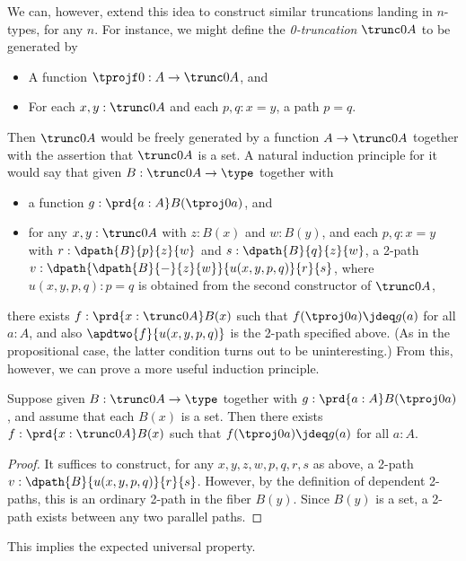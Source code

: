 %
We can, however, extend this idea to construct similar truncations landing in $n$-types, for any $n$.
For instance, we might define the \emph{0-trun\-ca\-tion} $\trunc0A$ to be generated by
\begin{itemize}
\item A function $\tprojf0 : A \to \trunc0 A$, and
\item For each $x,y:\trunc0A$ and each $p,q:x=y$, a path $p=q$.
\end{itemize}
Then $\trunc0A$ would be freely generated by a function $A\to \trunc0A$ together with the assertion that $\trunc0A$ is a set.
A natural induction principle for it would say that given $B:\trunc0 A \to \type$ together with
\begin{itemize}
\item a function $g:\prd{a:A} B(\tproj0a)$, and
\item for any $x,y:\trunc0A$ with $z:B(x)$ and $w:B(y)$, and each $p,q:x=y$ with $r:\dpath{B}{p}{z}{w}$ and $s:\dpath{B}{q}{z}{w}$, a 2-path $v:\dpath{\dpath{B}{-}{z}{w}}{u(x,y,p,q)}{r}{s}$, where $u(x,y,p,q):p=q$ is obtained from the second constructor of $\trunc0A$,
\end{itemize}
there exists $f:\prd{x:\trunc0A} B(x)$ such that $f(\tproj0a)\jdeq g(a)$ for all $a:A$, and also $\apdtwo{f}{u(x,y,p,q)}$ is the 2-path specified above.
(As in the propositional case, the latter condition turns out to be uninteresting.)
From this, however, we can prove a more useful induction principle.

\begin{lem}\label{thm:trunc0-ind}
  Suppose given $B:\trunc0 A \to \type$ together with $g:\prd{a:A} B(\tproj0a)$, and assume that each $B(x)$ is a set.
  Then there exists $f:\prd{x:\trunc0A} B(x)$ such that $f(\tproj0a)\jdeq g(a)$ for all $a:A$.
\end{lem}
\begin{proof}
  It suffices to construct, for any $x,y,z,w,p,q,r,s$ as above, a 2-path $v:\dpath{B}{u(x,y,p,q)}{r}{s}$.
  However, by the definition of dependent 2-paths, this is an ordinary 2-path in the fiber $B(y)$.
  Since $B(y)$ is a set, a 2-path exists between any two parallel paths.
\end{proof}

This implies the expected universal property.

